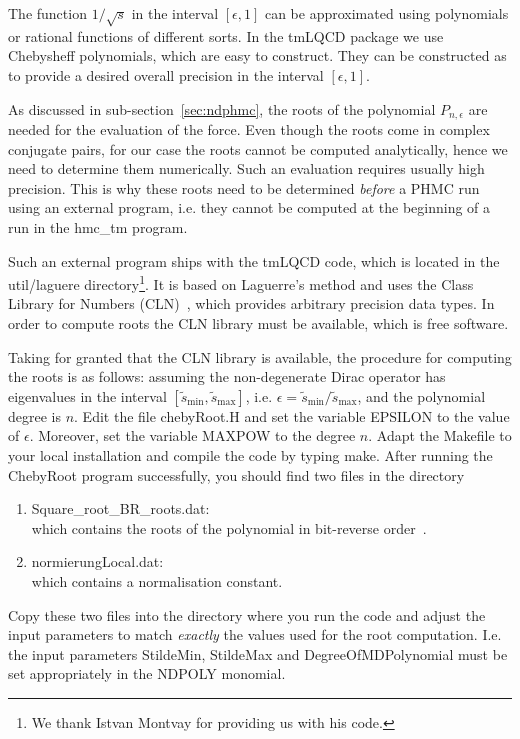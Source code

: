 \label{sec:root}

The function $1/\sqrt{s}$ in the interval $[\epsilon,1]$ can be
approximated using polynomials or rational functions of different
sorts. In the tmLQCD package we use Chebysheff polynomials, which
are easy to construct. They can be constructed as to provide a desired
overall precision in the interval $[\epsilon,1]$. 

As discussed in sub-section~\ref{sec:ndphmc}, the roots of the
polynomial $P_{n,\epsilon}$ are needed for the evaluation of the
force. Even though the roots come in complex conjugate pairs, for our
case the roots cannot be computed analytically, hence we need to
determine them numerically. Such an evaluation requires usually
high precision. This is why these roots need to be determined
\emph{before} a PHMC run using an external program, i.e. they cannot
be computed at the beginning of a run in the {\ttfamily hmc\_tm}
program. 

Such an external program ships with the tmLQCD code, which is located in the
{\ttfamily util/laguere} directory\footnote{We thank Istvan Montvay
  for providing us with his code.}. It is based on Laguerre's
method and uses the Class Library for Numbers
(CLN)~\cite{cln:web}, which provides arbitrary precision data
types. In order to compute roots the CLN library must be available,
which is free software.

Taking for granted that the CLN library is available,
the procedure for computing the roots is as follows: assuming the
non-degenerate Dirac operator has eigenvalues in the interval $[\tilde
s_\mathrm{min},\tilde s_\mathrm{max}]$, i.e. $\epsilon = \tilde
s_\mathrm{min}/\tilde s_\mathrm{max}$, and the polynomial degree is
$n$. Edit the file {\ttfamily chebyRoot.H} and set the
variable {\ttfamily EPSILON} to the value of $\epsilon$. Moreover,
set the variable {\ttfamily MAXPOW} to the degree $n$. Adapt the
{\ttfamily Makefile} to your local installation and compile the code
by typing {\ttfamily make}. After running the {\ttfamily ChebyRoot}
program successfully, you should find two files in the directory
\begin{enumerate}
\item {\ttfamily Square\_root\_BR\_roots.dat}:\\
  which contains the roots of the polynomial in bit-reverse
  order~\cite{Frezzotti:1997ym}.
\item {\ttfamily normierungLocal.dat}:\\
  which contains a normalisation constant. 
\end{enumerate}
Copy these two files into the directory where you run the code and
adjust the input parameters to match \emph{exactly} the values used
for the root computation. I.e. the input parameters {\ttfamily
  StildeMin}, {\ttfamily StildeMax} and {\ttfamily
  DegreeOfMDPolynomial} must be set appropriately in the {\ttfamily
  NDPOLY} monomial.

